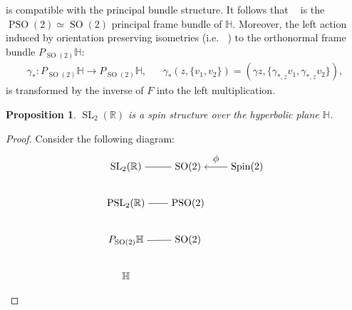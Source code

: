 \documentclass[12pt]{amsart}
\newtheorem{proposition}{Proposition}%
\theoremstyle{definition}
\def\RR{{\mathbb R}}
\def\HH{{\mathbb{H}}}
\def\g{{\gamma}}
\DeclareMathOperator{\psl}{PSL_2(\mathbb{R})}
\newcommand{\slinear}{\operatorname{SL}}
\newcommand{\so}{\operatorname{SO}}
\newcommand{\pso}{\operatorname{PSO}}
\newcommand{\spin}{\operatorname{Spin}}
\begin{document}
is compatible with the principal bundle structure. It follows that $\psl$ is the $\pso(2)\simeq\so(2)$ principal frame bundle of $\HH$. Moreover, the left action induced by orientation preserving isometries (i.e. $\psl$) to the orthonormal frame bundle $P_{\so(2)}\HH$:
\begin{align*}
\g_*:P_{\so (2)}\HH\longrightarrow P_{\so (2)}\HH, && 
\g_*\left(z, \{ v_1, v_2 \} \right) = \left( \g z, \{ \g_{*,z}v_1, \g_{*,z}v_2 \} \right),
\end{align*}
is transformed by the inverse of $F$ into the left multiplication.

\begin{proposition}\label{spinStructureForH}
$\slinear_2(\RR)$ is a spin structure over the hyperbolic plane $\HH$.
\end{proposition}
\begin{proof}
Consider the following diagram:
	\begin{equation}\label{sl2spinstructure}
		\begin{tikzpicture}[baseline=(current  bounding  box.center)]
			\matrix (m) [matrix of math nodes,row sep=2em,column sep=2em,minimum width=2em]
			{
				\slinear_2(\RR) & \so(2) & \spin(2) \\
				\psl & \pso(2) \\
				P_{\so(2)}\HH & \so(2) \\
				\HH & {} \\  
			};
			\path
			(m-1-1) edge node [ above] {} (m-1-2)
			(m-2-1)	edge node [below] {} (m-2-2)
			(m-3-1)	edge node [below] {} (m-3-2);
			
			\path[<-]
			(m-1-2) edge node [ above] {$\phi$} (m-1-3);
			

\end{tikzpicture}
\end{equation}
\end{proof}
\end{document}

